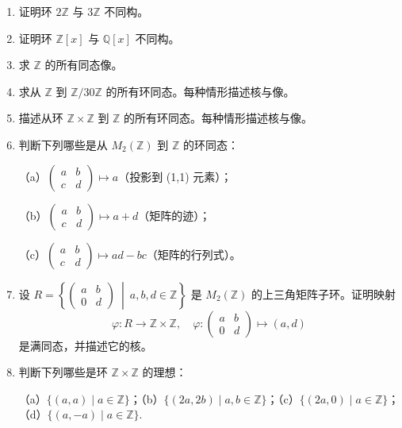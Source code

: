 \begin{enumerate}
\item 证明环 \(2\mathbb{Z}\) 与 \(3\mathbb{Z}\) 不同构。

\item 证明环 \(\mathbb{Z}[x]\) 与 \(\mathbb{Q}[x]\) 不同构。

\item 求 \(\mathbb{Z}\) 的所有同态像。

\item 求从 \(\mathbb{Z}\) 到 \(\mathbb{Z}/30\mathbb{Z}\) 的所有环同态。每种情形描述核与像。

\item 描述从环 \(\mathbb{Z} \times \mathbb{Z}\) 到 \(\mathbb{Z}\) 的所有环同态。每种情形描述核与像。

\item 判断下列哪些是从 \(M_2(\mathbb{Z})\) 到 \(\mathbb{Z}\) 的环同态：

（a）\(\begin{pmatrix} a & b \\ c & d \end{pmatrix} \mapsto a\)（投影到 (1,1) 元素）；

（b）\(\begin{pmatrix} a & b \\ c & d \end{pmatrix} \mapsto a+d\)（矩阵的迹）；

（c）\(\begin{pmatrix} a & b \\ c & d \end{pmatrix} \mapsto ad-bc\)（矩阵的行列式）。

\item 设 \(R = \left\{\begin{pmatrix} a & b \\ 0 & d \end{pmatrix} \ \middle|\ a, b, d \in \mathbb{Z}\right\}\) 是 \(M_2(\mathbb{Z})\) 的上三角矩阵子环。证明映射
\[
\varphi : R \to \mathbb{Z} \times \mathbb{Z}, \quad \varphi : \begin{pmatrix} a & b \\ 0 & d \end{pmatrix} \mapsto (a, d)
\]
是满同态，并描述它的核。

\item 判断下列哪些是环 \(\mathbb{Z} \times \mathbb{Z}\) 的理想：

（a）\(\{(a, a) \mid a \in \mathbb{Z}\}\)；（b）\(\{(2a, 2b) \mid a, b \in \mathbb{Z}\}\)；（c）\(\{(2a, 0) \mid a \in \mathbb{Z}\}\)；（d）\(\{(a, -a) \mid a \in \mathbb{Z}\}\).


\end{enumerate}
